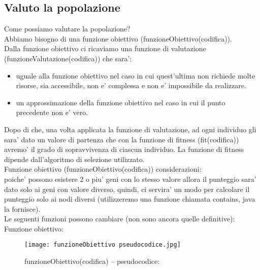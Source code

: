 \documentclass[10pt,a4paper]{article}
\begin{document}
    \subsection{Valuto la popolazione}
      \label{valutoLaPopolazioneSubsection}
      
      Come possiamo valutare la popolazione?\\
      Abbiamo bisogno di una funzione obiettivo (funzioneObiettivo(codifica)).\\
      Dalla funzione obiettivo ci ricaviamo una funzione di valutazione (funzioneValutazione(codifica)) che sara':
      \begin{itemize}
        \item uguale alla funzione obiettivo nel caso in cui quest'ultima non richiede molte risorse, 
        sia accessibile, non e' complessa e non e' impossibile da realizzare.
        \item un approssimazione della funzione obiettivo nel caso in cui il punto precedente non e' 
        vero. 
      \end{itemize}
      Dopo di che, una volta applicata la funzione di valutazione, ad ogni individuo gli sara' dato un valore di 
      partenza che con la funzione di fitness (fit(codifica)) avremo' il grado di sopravvivenza di ciascun 
      individuo. La funzione di fitness dipende dall'algoritmo di selezione utilizzato.\\
      Funzione obiettivo (funzioneObiettivo(codifica)) considerazioni:\\
      poiche' possono esistere 2 o piu' geni con lo stesso valore allora il punteggio sara' dato solo ai 
      geni con valore diverso, quindi, ci servira' un modo per calcolare il punteggio solo ai nodi 
      diversi (utilizzeremo una funzione chiamata contains, java la fornisce).\\
      Le seguenti funzioni possono cambiare (non sono ancora quelle definitive):\\
      Funzione obiettivo:\\
      \begin{figure}[h!]
        \centering
        \caption{funzioneObiettivo(codifica) -- pseudocodice:}
        \texttt{[image: funzioneObiettivo pseudocodice.jpg]}
        \label{funzioneObiettivoPseudocodice}
      \end{figure}
\end{document}

